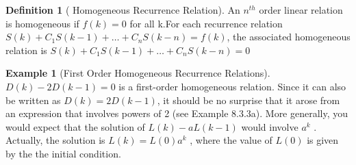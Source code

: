 \documentclass[10pt,]{book}
\theoremstyle{plain}
\theoremstyle{definition}
\newtheorem{definition}[theorem]{Definition}
\theoremstyle{definition}
\theoremstyle{definition}
\newtheorem{example}[theorem]{Example}
\theoremstyle{definition}
\numberwithin{equation}{section}
\begin{document}
\begin{definition}[ Homogeneous Recurrence Relation]\label{def-homogeneous-recurrence-relation}
An \(n^{th}\) order linear relation is homogeneous if \(f(k)
= 0\) for all k.For each recurrence relation \(S(k) + C_1S(k - 1) +\ldots + C_n S(k - n) = f(k)\), the associated homogeneous relation is \(S(k)
+ C_1S(k - 1) +\ldots + C_n S(k - n) =0\)
%
\end{definition}
\begin{example}[First Order Homogeneous Recurrence Relations]\label{ex-first-order-homogeneous-rr}
\(D(k) - 2D(k - 1) = 0\) is a first-order homogeneous relation. Since it can also be written as \(D(k) =
2D(k - 1)\), it should be no surprise that it arose from an expression that involves powers of 2 (see Example 8.3.3a). More generally, you would
expect that the solution of \(L(k) - a L(k - 1)\) would involve \(a^k\) . Actually, the solution is \(L(k) = L(0)a^k\) , where the value of \(L(0)\)
is given by the the initial condition.
%
\end{example}
\end{document}
